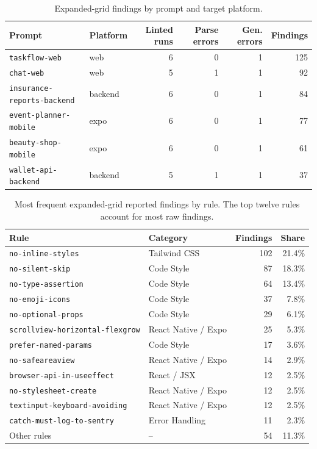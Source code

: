 \begin{table}[ht]
  \centering
  \small
  \begin{tabular}{llrrrr}
    \toprule
    Prompt & Platform & Linted runs & Parse errors & Gen. errors & Findings \\
    \midrule
    \texttt{taskflow-web} & web & 6 & 0 & 1 & 125 \\
    \texttt{chat-web} & web & 5 & 1 & 1 & 92 \\
    \texttt{insurance-reports-backend} & backend & 6 & 0 & 1 & 84 \\
    \texttt{event-planner-mobile} & expo & 6 & 0 & 1 & 77 \\
    \texttt{beauty-shop-mobile} & expo & 6 & 0 & 1 & 61 \\
    \texttt{wallet-api-backend} & backend & 5 & 1 & 1 & 37 \\
    \bottomrule
  \end{tabular}
  \caption{Expanded-grid findings by prompt and target platform.}
  \label{tab:expanded-by-prompt}
\end{table}

\begin{table}[ht]
  \centering
  \scriptsize
  \begin{tabular}{llrr}
    \toprule
    Rule & Category & Findings & Share \\
    \midrule
    \texttt{no-inline-styles} & Tailwind CSS & 102 & 21.4\% \\
    \texttt{no-silent-skip} & Code Style & 87 & 18.3\% \\
    \texttt{no-type-assertion} & Code Style & 64 & 13.4\% \\
    \texttt{no-emoji-icons} & Code Style & 37 & 7.8\% \\
    \texttt{no-optional-props} & Code Style & 29 & 6.1\% \\
    \texttt{scrollview-horizontal-flexgrow} & React Native / Expo & 25 & 5.3\% \\
    \texttt{prefer-named-params} & Code Style & 17 & 3.6\% \\
    \texttt{no-safeareaview} & React Native / Expo & 14 & 2.9\% \\
    \texttt{browser-api-in-useeffect} & React / JSX & 12 & 2.5\% \\
    \texttt{no-stylesheet-create} & React Native / Expo & 12 & 2.5\% \\
    \texttt{textinput-keyboard-avoiding} & React Native / Expo & 12 & 2.5\% \\
    \texttt{catch-must-log-to-sentry} & Error Handling & 11 & 2.3\% \\
    Other rules & -- & 54 & 11.3\% \\
    \bottomrule
  \end{tabular}
  \caption{Most frequent expanded-grid reported findings by rule. The top twelve rules account for most raw findings.}
  \label{tab:expanded-by-rule}
\end{table}

